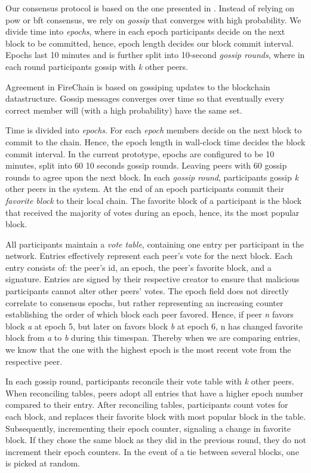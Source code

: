 \documentclass[USenglish]{uit-thesis}
\begin{document}
Our consensus protocol is based on the one presented in \cite{vanblock}.
Instead of relying on \gls{pow} or \gls{bft} consensus, we rely on \textit{gossip} that converges with high probability.
We divide time into \textit{epochs}, where in each epoch participants decide on the next block to be committed, hence, epoch length decides our block commit interval.
Epochs last 10 minutes and is further split into 10-second \textit{gossip rounds}, where in each round participants gossip with \textit{k} other peers.


\fi
Agreement in FireChain is based on gossiping updates to the blockchain datastructure. 
Gossip messages converges over time so that eventually every correct member will (with a high probability) have the same set.

Time is divided into \textit{epochs}. 
For each \textit{epoch} members decide on the next block to commit to the chain. 
Hence, the epoch length in wall-clock time decides the block commit interval.
In the current prototype, epochs are configured to be 10 minutes, split into 60 10 seconds gossip rounds. 
Leaving peers with 60 gossip rounds to agree upon the next block.
In each \textit{gossip round}, participants gossip \textit{k} other peers in the system.
At the end of an epoch participants commit their \textit{favorite block} to their local chain.
The favorite block of a participant is the block that received the majority of votes during an epoch, hence, its the most popular block.


All participants maintain a \textit{vote table}, containing one entry per participant in the network.
Entries effectively represent each peer's vote for the next block.
Each entry consists of: the peer's id, an epoch, the peer's favorite block, and a signature. 
Entries are signed by their respective creator to ensure that malicious participants cannot alter other peers' votes.
The epoch field does not directly correlate to consensus epochs, but rather representing an increasing counter establishing the order of which block each peer favored.
Hence, if peer \textit{n} favors block \textit{a} at epoch 5, but later on favors block \textit{b} at epoch 6, n has changed favorite block from \textit{a} to \textit{b} during this timespan.
Thereby when we are comparing entries, we know that the one with the highest epoch is the most recent vote from the respective peer.
 
In each gossip round, participants reconcile their vote table with \textit{k} other peers.
When reconciling tables, peers adopt all entries that have a higher epoch number compared to their entry. 
After reconciling tables, participants count votes for each block, and replaces their favorite block with most popular block in the table.
Subsequently, incrementing their epoch counter, signaling a change in favorite block.
If they chose the same block as they did in the previous round, they do not increment their epoch counters. 
In the event of a tie between several blocks, one is picked at random.
\end{document}
